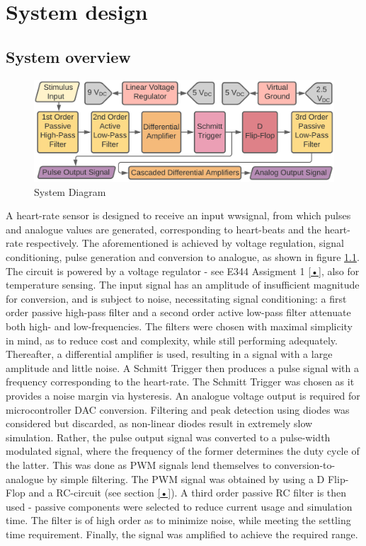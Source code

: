 
\chapter{System design}
\section{System overview} \label{sec:system}

\begin{figure}[h]
    \centering
    \vspace{-0.7cm}
    \includegraphics[width = 1\textwidth]{Figures/overview}
    \caption{System Diagram}
    \label{fig:overview}
\end{figure}

A heart-rate sensor is designed to receive an input wwsignal, from which pulses and analogue values are generated, corresponding to heart-beats and the heart-rate respectively. The aforementioned is achieved by voltage regulation, signal conditioning, pulse generation and conversion to analogue, as shown in figure \ref{fig:overview}. The circuit is powered by a voltage regulator - see E344 Assigment 1 \ref{•}, also for temperature sensing. The input signal has an amplitude of insufficient magnitude for conversion, and is subject to noise, necessitating signal conditioning: a first order passive high-pass filter and a second order active low-pass filter attenuate both high- and low-frequencies. The filters were chosen with maximal simplicity in mind, as to reduce cost and complexity, while still performing adequately. Thereafter, a differential amplifier is used, resulting in a signal with a large amplitude and little noise. A Schmitt Trigger then produces a pulse signal with a frequency corresponding to the heart-rate. The Schmitt Trigger was chosen as it provides a noise margin via hysteresis. An analogue voltage output is required for microcontroller DAC conversion. Filtering and peak detection using diodes was considered but discarded, as non-linear diodes result in extremely slow simulation. Rather, the pulse output signal was converted to a pulse-width modulated signal, where the frequency of the former determines the duty cycle of the latter. This was done as PWM signals lend themselves to conversion-to-analogue by simple filtering. The PWM signal was obtained by using a D Flip-Flop and a RC-circuit (see section \ref{•}). A third order passive RC filter is then used - passive components were selected to reduce current usage and simulation time. The filter is of high order as to minimize noise, while meeting the settling time requirement. Finally, the signal was amplified to achieve the required range.

